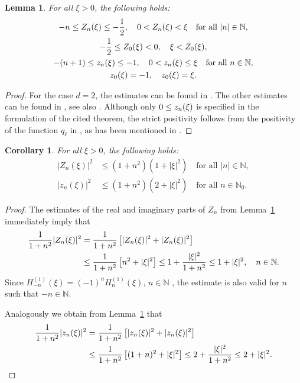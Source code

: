 \documentclass[12pt,DIV=14]{scrartcl}
\newtheorem{lemma}[definition]{Lemma}
\newtheorem{corollary}[definition]{Corollary}
\providecommand{\N}{\mathbb{N}}
\let\Re\relax\DeclareMathOperator{\Re}{Re}
\let\Im\relax\DeclareMathOperator{\Im}{Im}
\begin{document}
\begin{lemma}\label{l:propHankelfunctions}
For all $\xi>0$, the following holds:
\begin{gather*}
-n \le \Re Z_n(\xi) \le -\frac12,
\quad
0 < \Im Z_n(\xi) < \xi
\quad\text{for all }
|n|\in\N,\\
-\frac12 \le \Re Z_0(\xi) < 0,
\quad
\xi < \Im Z_0(\xi),
\\
-(n+1)\le \Re z_n(\xi) \le -1,
\quad
0 < \Im z_n(\xi) \le \xi
\quad\text{for all }
n\in\N,\\
\Re z_0(\xi) = -1,
\quad
\Im z_0(\xi) = \xi.
\end{gather*}
\end{lemma}
\begin{proof}
For the case $d=2$,
the estimates can be found in \cite[eq.~(2.34)]{Shen:07}.
The other estimates can be found in \cite[Thm.~2.6.1]{Nedelec:01}, see also
\cite[eqs.~(2.22), (2.23)]{Shen:07}.
Although only $0\le \Im z_n(\xi)$ is specified in the formulation of the cited theorem,
the strict positivity follows from the positivity of the function $q_\ell$
in \cite[eq.~(2.6.34)]{Nedelec:01}, as has been mentioned in \cite{Melenk:10}.
\end{proof}
\begin{corollary}\label{cor:propHankelfunctions}
For all $\xi>0$, the following holds:
\begin{align*}
|Z_n(\xi)|^2 &\le (1+n^2)(1 + |\xi|^2)
\quad\text{for all }
|n|\in\N,\\
|z_n(\xi)|^2 &\le (1+n^2)(2 + |\xi|^2)
\quad\text{for all }
n\in\N_0.
\end{align*}
\end{corollary}
\begin{proof}
The estimates of the real and imaginary parts of $Z_n$ from Lemma~\ref{l:propHankelfunctions}
immediately imply that
\begin{align*}
\frac{1}{1+n^2} |Z_n(\xi)|^2
&= \frac{1}{1+n^2} \left[|\Re Z_n(\xi)|^2 + |\Im Z_n(\xi)|^2\right]\\
&\le \frac{1}{1+n^2} \left[n^2 + |\xi|^2\right]
\le 1 + \frac{|\xi|^2}{1+n^2}
\le 1 + |\xi|^2,
\quad
n\in\N.
\end{align*}
Since $H^{(1)}_{-n}(\xi)=(-1)^n H^{(1)}_{n}(\xi)$, $n\in\N$
\cite[eq.~(10.4.2)]{NIST:22}, the estimate is also valid for $n$ such that $-n\in\N$.

Analogously we obtain from Lemma~\ref{l:propHankelfunctions} that
\begin{align*}
\frac{1}{1+n^2} |z_n(\xi)|^2
&= \frac{1}{1+n^2} \left[|\Re z_n(\xi)|^2 + |\Im z_n(\xi)|^2\right]\\
&\le \frac{1}{1+n^2} \left[(1+n)^2 + |\xi|^2\right]
\le 2 + \frac{|\xi|^2}{1+n^2}
\le 2 + |\xi|^2.
\end{align*}
\end{proof}
\end{document}
